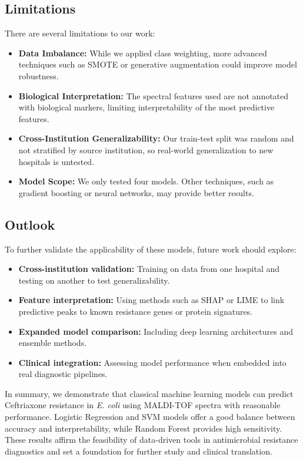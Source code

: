 \documentclass{article}
\begin{document}
\subsection*{Limitations}
There are several limitations to our work:
\begin{itemize}
    \item \textbf{Data Imbalance:} While we applied class weighting, more advanced techniques such as SMOTE or generative augmentation could improve model robustness.
    \item \textbf{Biological Interpretation:} The spectral features used are not annotated with biological markers, limiting interpretability of the most predictive features.
    \item \textbf{Cross-Institution Generalizability:} Our train-test split was random and not stratified by source institution, so real-world generalization to new hospitals is untested.
    \item \textbf{Model Scope:} We only tested four models. Other techniques, such as gradient boosting or neural networks, may provide better results.
\end{itemize}

\subsection*{Outlook}
To further validate the applicability of these models, future work should explore:
\begin{itemize}
    \item \textbf{Cross-institution validation:} Training on data from one hospital and testing on another to test generalizability.
    \item \textbf{Feature interpretation:} Using methods such as SHAP or LIME to link predictive peaks to known resistance genes or protein signatures.
    \item \textbf{Expanded model comparison:} Including deep learning architectures and ensemble methods.
    \item \textbf{Clinical integration:} Assessing model performance when embedded into real diagnostic pipelines.
\end{itemize}

In summary, we demonstrate that classical machine learning models can predict Ceftriaxone resistance in \textit{E. coli} using MALDI-TOF spectra with reasonable performance. Logistic Regression and SVM models offer a good balance between accuracy and interpretability, while Random Forest provides high sensitivity. These results affirm the feasibility of data-driven tools in antimicrobial resistance diagnostics and set a foundation for further study and clinical translation.





\end{document}
